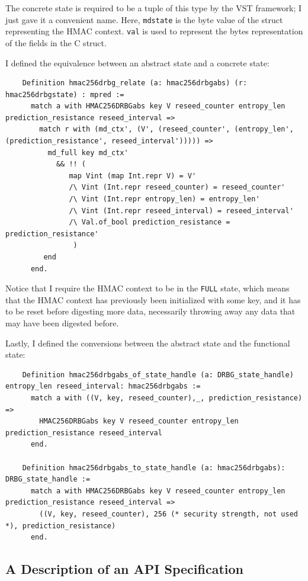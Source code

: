 \documentclass[pageno]{jpaper}
\begin{document}
The concrete state is required to be a tuple of this type by the VST framework; I just gave it a convenient name. Here, \lstinline{mdstate} is the byte value of the struct representing the HMAC context. \lstinline{val} is used to represent the bytes representation of the fields in the C struct.

I defined the equivalence between an abstract state and a concrete state:

\begin{lstlisting}
    Definition hmac256drbg_relate (a: hmac256drbgabs) (r: hmac256drbgstate) : mpred :=
      match a with HMAC256DRBGabs key V reseed_counter entropy_len prediction_resistance reseed_interval =>
        match r with (md_ctx', (V', (reseed_counter', (entropy_len', (prediction_resistance', reseed_interval'))))) =>
          md_full key md_ctx'
            && !! (
               map Vint (map Int.repr V) = V'
               /\ Vint (Int.repr reseed_counter) = reseed_counter'
               /\ Vint (Int.repr entropy_len) = entropy_len'
               /\ Vint (Int.repr reseed_interval) = reseed_interval'
               /\ Val.of_bool prediction_resistance = prediction_resistance'
                )
         end
      end.
\end{lstlisting}

Notice that I require the HMAC context to be in the \lstinline{FULL} state, which means that the HMAC context has previously been initialized with some key, and it has to be reset before digesting more data, necessarily throwing away any data that may have been digested before.

Lastly, I defined the conversions between the abstract state and the functional state:

\begin{lstlisting}
    Definition hmac256drbgabs_of_state_handle (a: DRBG_state_handle) entropy_len reseed_interval: hmac256drbgabs :=
      match a with ((V, key, reseed_counter),_, prediction_resistance) =>
        HMAC256DRBGabs key V reseed_counter entropy_len prediction_resistance reseed_interval
      end.

    Definition hmac256drbgabs_to_state_handle (a: hmac256drbgabs): DRBG_state_handle :=
      match a with HMAC256DRBGabs key V reseed_counter entropy_len prediction_resistance reseed_interval =>
        ((V, key, reseed_counter), 256 (* security strength, not used *), prediction_resistance)
      end.
\end{lstlisting}

\subsection{A Description of an API Specification}\label{api_spec}
\end{document}
